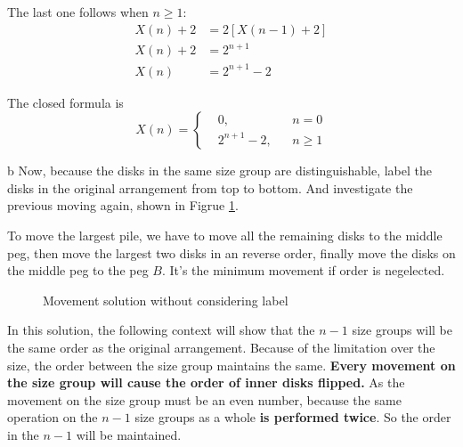 \documentclass[a4paper,12pt]{article}
\makeatletter
\newtheorem*{solution}{Solution}
\theoremstyle{definition}
\renewenvironment{solution}[1][Solution] {\par\pushQED{\qed}\normalfont\topsep6\p@\@plus6\p@\relax\trivlist\item[\hskip\labelsep\bfseries#1\@addpunct{.}]\ignorespaces}{\popQED\endtrivlist\@endpefalse} \makeatother
\newenvironment{problems}{\begin{list}{}{\renewcommand{\makelabel}[1]{\textbf{##1}\hfil}}}{\end{list}}
\newenvironment{steps}{\begin{list}{}{\renewcommand{\makelabel}[1]{\textbf{##1}\hfil}}}{\end{list}}
\makeatother
\begin{document}
\begin{problems}
\begin{solution}
\begin{steps}
            The last one follows when $n\geq 1$:
            \begin{align*}
                X(n) + 2 &= 2\left[X(n-1)+2\right]\\
                X(n) + 2 &= 2^{n+1}\\
                X(n)     &= 2^{n+1} - 2
            \end{align*}

            The closed formula is
            \begin{equation*}
                X(n) = \left\{\begin{aligned}
                    &0,&&n=0\\
                    &2^{n+1}-2,&&n\geq 1
                \end{aligned}\right.
            \end{equation*}

            \item[b] Now, because the disks in the same size group are distinguishable, label the disks in the original arrangement from top to bottom. And investigate the previous moving again, shown in Figrue \ref{fig:x}.
            
            To move the largest pile, we have to move all the remaining disks to the middle peg, then move the largest two disks in an reverse order, finally move the disks on the middle peg to the peg $B$. It's the minimum movement if order is negelected.

            \providecommand{\scalenum}{0.55}
            \begin{figure}
                \subfigure[move $2n-1$ to $B$]{}
                \subfigure[move $2n$ to $B$]{}
                \caption{Movement solution without considering label}
                \label{fig:x}
            \end{figure}
            
            In this solution, the following context will show that the $n-1$ size groups will be the same order as the original arrangement. Because of the limitation over the size, the order between the size group maintains the same. \textbf{Every movement on the size group will cause the order of inner disks flipped.} As the movement on the size group must be an even number, because the same operation on the $n-1$ size groups as a whole \textbf{is performed twice}. So the order in the $n-1$ will be maintained.


\end{steps}
\end{solution}
\end{problems}
\end{document}
